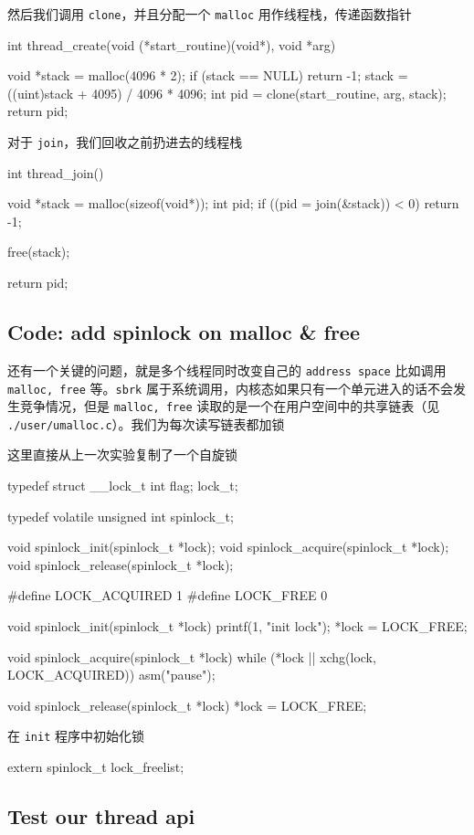 然后我们调用 \texttt{clone}，并且分配一个 \texttt{malloc} 用作线程栈，传递函数指针

\begin{ccode}
    int
    thread_create(void (*start_routine)(void*), void *arg) 
    {
                  
        void *stack = malloc(4096 * 2);
        if (stack == NULL) return -1;
        stack = ((uint)stack + 4095) / 4096 * 4096;
        int pid = clone(start_routine, arg, stack);
        return pid;
    }
\end{ccode}

对于 \texttt{join}，我们回收之前扔进去的线程栈

\begin{ccode}
    int
    thread_join()
    {
        void *stack = malloc(sizeof(void*));
        int pid;
        if ((pid = join(&stack)) < 0) return -1;
        
        free(stack);
        
        return pid;
    }
\end{ccode}


\subsection{Code: add spinlock on malloc \& free}

还有一个关键的问题，就是多个线程同时改变自己的 \texttt{address space} 比如调用 \texttt{malloc, free} 等。\texttt{sbrk} 属于系统调用，内核态如果只有一个单元进入的话不会发生竞争情况，但是 \texttt{malloc, free} 读取的是一个在用户空间中的共享链表（见 \texttt{./user/umalloc.c}）。我们为每次读写链表都加锁

这里直接从上一次实验复制了一个自旋锁

\begin{ccode}
    typedef struct __lock_t { int flag; } lock_t;

    typedef volatile unsigned int spinlock_t;

    void spinlock_init(spinlock_t *lock);
    void spinlock_acquire(spinlock_t *lock);
    void spinlock_release(spinlock_t *lock);

    #define LOCK_ACQUIRED 1
    #define LOCK_FREE 0

    void spinlock_init(spinlock_t *lock)
    {
        printf(1, "init lock\n");
        *lock = LOCK_FREE;
    }

    void spinlock_acquire(spinlock_t *lock)
    {
        while (*lock || xchg(lock, LOCK_ACQUIRED))
        {
            asm("pause");
        }
    }

    void spinlock_release(spinlock_t *lock)
    {
        *lock = LOCK_FREE;
    }
\end{ccode}

在 \texttt{init} 程序中初始化锁

\begin{ccode}
    
    extern spinlock_t lock_freelist;
\end{ccode}


\subsection{Test our thread api}